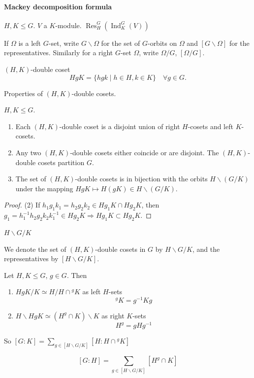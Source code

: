 \documentclass[11pt, a4paper]{report}
\begin{document}
\paragraph{Mackey decomposition formula}

$H, K \leqslant G$. $V$ a $K$-module. $\operatorname{Res}_{H}^{G}(\operatorname{Ind}_{K}^{G}(V))$

If $\Omega$ is a left $G$-set, write $G \backslash \Omega$ for the set of $G$-orbits on $\Omega$ and $[G \backslash \Omega]$ for the representatives. Similarly for a right $G$-set $\Omega$, write $\Omega / G$, $[\Omega / G]$.

\begin{definition}
$(H, K)$-double coset
\[ HgK = \{hgk \mid h \in H, k \in K\} \quad \forall g \in G. \]
\end{definition}

\begin{lemma}
Properties of $(H, K)$-double cosets.

$H, K \leqslant G$.
\begin{enumerate}
\item Each $(H, K)$-double coset is a disjoint union of right $H$-cosets and left $K$-cosets.
\item Any two $(H, K)$-double cosets either coincide or are disjoint. The $(H, K)$-double cosets partition $G$.
\item The set of $(H, K)$-double cosets is in bijection with the orbits $H \backslash (G/K)$ under the mapping $HgK \mapsto H(gK) \in H \backslash (G/K)$.
\end{enumerate}
\end{lemma}

\begin{proof}
(2) If $h_{1} g_{1} k_{1} = h_{2} g_{2} k_{2} \in Hg_{1}K \cap Hg_{2}K$, then $g_{1} = h_{1}^{-1} h_{2} g_{2} k_{2} k_{1}^{-1} \in Hg_{2}K \Rightarrow Hg_{1}K \subset Hg_{2}K$.
\end{proof}

\begin{definition}
$H \backslash G / K$

We denote the set of $(H, K)$-double cosets in $G$ by $H \backslash G / K$, and the representatives by $[H \backslash G / K]$.
\end{definition}

\begin{lemma}
Let $H, K \leqslant G$, $g \in G$. Then
\begin{enumerate}
\item $H g K / K \simeq H / H \cap {}^{g}K$ as left $H$-sets
\[
{}^{g}K = g^{-1} K g
\]
\item $H \backslash H g K \simeq (H^{g} \cap K) \backslash K$ as right $K$-sets
\[
H^{g} = g H g^{-1}
\]
\end{enumerate}
So $[G: K]=\sum_{g \in[H \backslash G / K]}[H: H \cap {}^{g}K]$

\[
[G: H]=\sum_{g \in[H \backslash G / K]}[H^{g} \cap K]
\]

\end{lemma}
\end{document}
